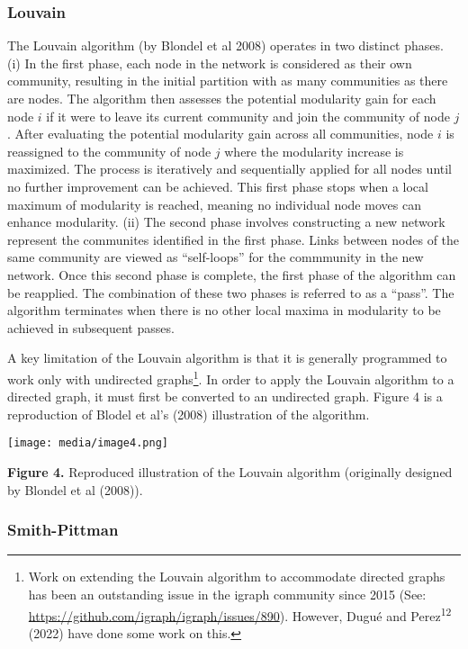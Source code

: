 \subsubsection{Louvain}\label{louvain}

The Louvain algorithm (by Blondel et al 2008) operates in two distinct
phases. (i) In the first phase, each node in the network is considered
as their own community, resulting in the initial partition with as many
communities as there are nodes. The algorithm then assesses the
potential modularity gain for each node \(i\) if it were to leave its
current community and join the community of node \(j\). After evaluating
the potential modularity gain across all communities, node \(i\) is
reassigned to the community of node \(j\) where the modularity increase
is maximized. The process is iteratively and sequentially applied for
all nodes until no further improvement can be achieved. This first phase
stops when a local maximum of modularity is reached, meaning no
individual node moves can enhance modularity. (ii) The second phase
involves constructing a new network represent the communites identified
in the first phase. Links between nodes of the same community are viewed
as ``self-loops'' for the commmunity in the new network. Once this
second phase is complete, the first phase of the algorithm can be
reapplied. The combination of these two phases is referred to as a
``pass''. The algorithm terminates when there is no other local maxima
in modularity to be achieved in subsequent passes.

A key limitation of the Louvain algorithm is that it is generally
programmed to work only with undirected graphs\footnote{Work on
  extending the Louvain algorithm to accommodate directed graphs has
  been an outstanding issue in the igraph community since 2015 (See:
  \url{https://github.com/igraph/igraph/issues/890}). However, Dugué and
  Perez\textsuperscript{12} (2022) have done some work on this.}. In
order to apply the Louvain algorithm to a directed graph, it must first
be converted to an undirected graph. Figure 4 is a reproduction of
Blodel et al's (2008) illustration of the algorithm.

\texttt{[image: media/image4.png]}

\textbf{Figure 4.} Reproduced illustration of the Louvain algorithm
(originally designed by Blondel et al (2008)).

\subsubsection{Smith-Pittman}\label{smith-pittman}


